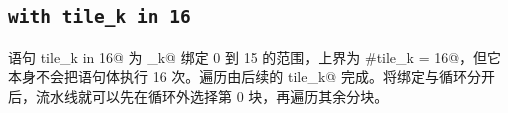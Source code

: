 \subsection*{\texttt{with tile\_k in 16}}

语句 \co@with tile_k in 16@ 为 \co@tile_k@ 绑定 0 到 15 的范围，上界为 \co@#tile_k = 16@，但它本身不会把语句体执行 16 次。遍历由后续的 \co@foreach tile_k@ 完成。将绑定与循环分开后，流水线就可以先在循环外选择第 0 块，再遍历其余分块。
